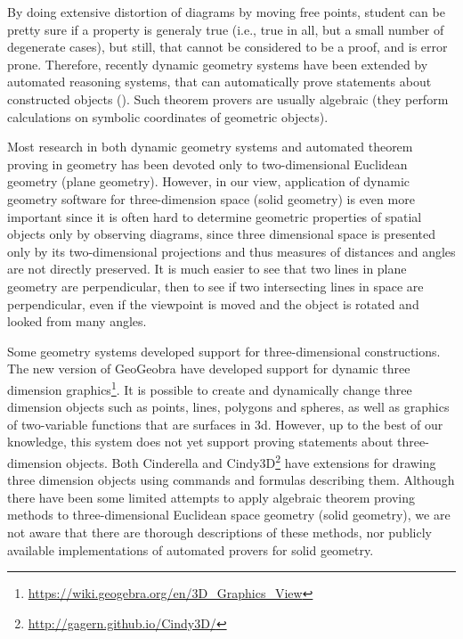 \documentclass[final,1p,times,authoryear]{elsarticle}
\begin{document}
By doing extensive distortion of diagrams by moving free points,
student can be pretty sure if a property is generaly true (i.e., true
in all, but a small number of degenerate cases), but still, that
cannot be considered to be a proof, and is error prone. Therefore,
recently dynamic geometry systems have been extended by automated
reasoning systems, that can automatically prove statements about
constructed objects (\cite{geogebra-provers}). Such theorem provers
are usually algebraic (they perform calculations on symbolic
coordinates of geometric objects).

Most research in both dynamic geometry systems and automated theorem
proving in geometry has been devoted only to two-dimensional Euclidean
geometry (plane geometry). However, in our view, application of
dynamic geometry software for three-dimension space (solid geometry)
is even more important since it is often hard to determine geometric
properties of spatial objects only by observing diagrams, since three
dimensional space is presented only by its two-dimensional projections
and thus measures of distances and angles are not directly
preserved. It is much easier to see that two lines in plane geometry
are perpendicular, then to see if two intersecting lines in space are
perpendicular, even if the viewpoint is moved and the object is
rotated and looked from many angles.

Some geometry systems developed support for three-dimensional
constructions. The new version of GeoGeobra have developed support for
dynamic three dimension
graphics\footnote{\url{https://wiki.geogebra.org/en/3D_Graphics_View}}. It
is possible to create and dynamically change three dimension objects
such as points, lines, polygons and spheres, as well as graphics of
two-variable functions that are surfaces in 3d. However, up to the
best of our knowledge, this system does not yet support proving
statements about three-dimension objects. Both Cinderella and
Cindy3D\footnote{\url{http://gagern.github.io/Cindy3D/}} have
extensions for drawing three dimension objects using commands and
formulas describing them. Although there have been some limited
attempts to apply algebraic theorem proving methods to
three-dimensional Euclidean space geometry (solid geometry), we are
not aware that there are thorough descriptions of these methods, nor
publicly available implementations of automated provers for solid
geometry.
\end{document}
